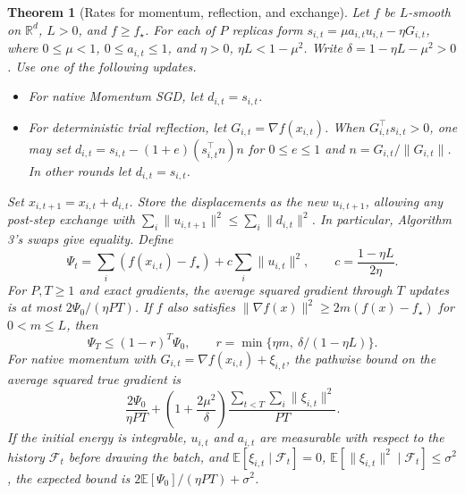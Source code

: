 \documentclass[10pt,letterpaper]{article}
\newtheorem{theorem}{Theorem}
\begin{document}
\clearpage
\begin{theorem}[Rates for momentum, reflection, and exchange]\label{thm:momentum-rate}
Let \(f\) be \(L\)-smooth on \(\mathbb R^d\), \(L>0\), and \(f\ge f_\star\). For each of \(P\) replicas form \(s_{i,t}=\mu a_{i,t}u_{i,t}-\eta G_{i,t}\), where \(0\le\mu<1\), \(0\le a_{i,t}\le1\), and
\(\eta>0\), \(\eta L<1-\mu^2\). Write \(\delta=1-\eta L-\mu^2>0\). Use one of the following updates.
\begin{itemize}\setlength{\itemsep}{0pt}
\item For native Momentum SGD, let \(d_{i,t}=s_{i,t}\).
\item For deterministic trial reflection, let \(G_{i,t}=\nabla f(x_{i,t})\). When \(G_{i,t}^\top s_{i,t}>0\), one may set \(d_{i,t}=s_{i,t}-(1+e)(s_{i,t}^\top n)n\) for \(0\le e\le1\) and \(n=G_{i,t}/\|G_{i,t}\|\). In other rounds let \(d_{i,t}=s_{i,t}\).
\end{itemize}
Set \(x_{i,t+1}=x_{i,t}+d_{i,t}\). Store the displacements as the new \(u_{i,t+1}\), allowing any post-step exchange with \(\sum_i\|u_{i,t+1}\|^2\le\sum_i\|d_{i,t}\|^2\). In particular, Algorithm 3's swaps give equality. Define
\[
\Psi_t=\sum_i(f(x_{i,t})-f_\star)+c\sum_i\|u_{i,t}\|^2,\qquad
c=\frac{1-\eta L}{2\eta}.
\]
For \(P,T\ge1\) and exact gradients, the average squared gradient through \(T\) updates is at most \(2\Psi_0/(\eta PT)\). If \(f\) also satisfies \(\|\nabla f(x)\|^2\ge 2m(f(x)-f_\star)\) for \(0<m\le L\), then
\[
\Psi_T\le (1-r)^T\Psi_0,\qquad
r=\min\{\eta m,\ \delta/(1-\eta L)\}.
\]
For native momentum with \(G_{i,t}=\nabla f(x_{i,t})+\xi_{i,t}\), the pathwise bound on the average squared true gradient is
\[
\frac{2\Psi_0}{\eta PT}+
\left(1+\frac{2\mu^2}{\delta}\right)
\frac{\sum_{t<T}\sum_i\|\xi_{i,t}\|^2}{PT}.
\]
If the initial energy is integrable, \(u_{i,t}\) and \(a_{i,t}\) are measurable with respect to the history \(\mathcal F_t\) before drawing the batch, and
\(\mathbb E[\xi_{i,t}\mid\mathcal F_t]=0\), \(\mathbb E[\|\xi_{i,t}\|^2\mid\mathcal F_t]\le\sigma^2\),
the expected bound is \(2\mathbb E[\Psi_0]/(\eta PT)+\sigma^2\).
\end{theorem}
\end{document}
